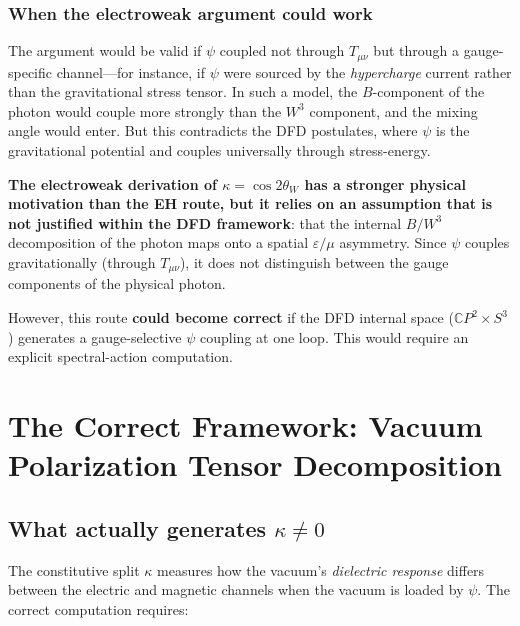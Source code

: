 \documentclass[11pt,a4paper]{article}
\begin{document}
\subsubsection{When the electroweak argument could work}

The argument would be valid if $\psi$ coupled not through $T_{\mu\nu}$ but
through a gauge-specific channel---for instance, if $\psi$ were sourced
by the \emph{hypercharge} current rather than the gravitational stress
tensor.  In such a model, the $B$-component of the photon would couple
more strongly than the $W^3$ component, and the mixing angle would enter.
But this contradicts the DFD postulates, where $\psi$ is the gravitational
potential and couples universally through stress-energy.

\begin{tcolorbox}[colback=orange!5!white, colframe=orange!60!black,
title=Verdict on Electroweak Route]
\textbf{The electroweak derivation of $\kappa = \cos 2\theta_W$ has a
stronger physical motivation than the EH route, but it relies on an
assumption that is not justified within the DFD framework}: that the
internal $B/W^3$ decomposition of the photon maps onto a spatial
$\varepsilon/\mu$ asymmetry.  Since $\psi$ couples gravitationally
(through $T_{\mu\nu}$), it does not distinguish between the gauge
components of the physical photon.

However, this route \textbf{could become correct} if the DFD internal
space ($\mathbb{C}P^2 \times S^3$) generates a gauge-selective $\psi$
coupling at one loop.  This would require an explicit spectral-action
computation.
\end{tcolorbox}

\section{The Correct Framework: Vacuum Polarization Tensor Decomposition}
\label{sec:correct}

\subsection{What actually generates $\kappa \neq 0$}

The constitutive split $\kappa$ measures how the vacuum's \emph{dielectric
response} differs between the electric and magnetic channels when the vacuum
is loaded by $\psi$.  The correct computation requires:
\end{document}
